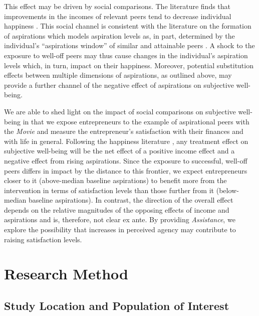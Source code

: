 \documentclass[11.5pt]{article}
\begin{document}
This effect may be driven by social comparisons. The literature finds that improvements in the incomes of relevant peers tend to decrease individual happiness \citep[e.g.,][]{Clark2010, Fafchamps2008, Luttmer2005, Ferrer-i-Carbonell2005, Stutzer2004, Senik2004, Senik2009}. This social channel is consistent with the literature on the formation of aspirations which models aspiration levels as, in part, determined by the individual's ``aspirations window'' of similar and attainable peers \citep{Ray2006, Genicot2017, Janzen2017}. A shock to the exposure to well-off peers may thus cause changes in the individual's aspiration levels which, in turn, impact on their happiness. Moreover, potential substitution effects between multiple dimensions of aspirations, as outlined above, may provide a further channel of the negative effect of aspirations on subjective well-being.

We are able to shed light on the impact of social comparisons on subjective well-being in that we expose entrepreneurs to the example of aspirational peers with the \emph{Movie} and measure the entrepreneur's satisfaction with their finances and with life in general. Following the happiness literature \citep[e.g.,][]{Easterlin1995, Easterlin2001, Easterlin2003, Clark2008, Frey2002}, any treatment effect on subjective well-being will be the net effect of a positive income effect and a negative effect from rising aspirations. Since the exposure to successful, well-off peers differs in impact by the distance to this frontier, we expect entrepreneurs closer to it (above-median baseline aspirations) to benefit more from the intervention in terms of satisfaction levels than those further from it (below-median baseline aspirations). In contrast, the direction of the overall effect depends on the relative magnitudes of the opposing effects of income and aspirations and is, therefore, not clear ex ante. By providing \emph{Assistance}, we explore the possibility that increases in perceived agency may contribute to raising satisfaction levels.


\section{\textbf{Research Method}}\label{sec.method}


\subsection{Study Location and Population of Interest}
\end{document}
